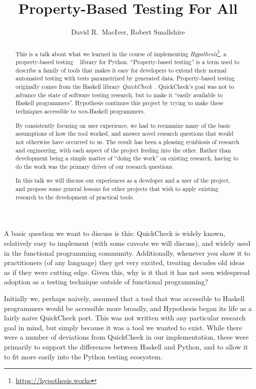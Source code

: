 \documentclass[10pt,conference]{IEEEtran}
\begin{document}
\author{David R.~MacIver, Robert Smallshire}
\title{Property-Based Testing For All}

\maketitle

\begin{abstract}
This is a talk about what we learned in the course of implementing \emph{Hypothesis}\footnote{\url{https://hypothesis.works}}, a property-based testing ~\cite{DBLP:conf/erlang/ArtsHJW06} library for Python.
``Property-based testing'' is a term used to describe a family of tools that makes it easy for developers to extend their normal automated testing with tests parametrized by generated data.
Property-based testing originally comes from the Haskell library \emph{QuickCheck}~\cite{DBLP:conf/icfp/ClaessenH00}.
QuickCheck's goal was not to advance the state of software testing research, but to make it ``easily available to Haskell programmers''. Hypothesis continues this project by trying to make these techniques accessible to \emph{non}-Haskell programmers.

By consistently focusing on user experience,
we had to reexamine many of the basic assumptions of how the tool worked,
and answer novel research questions that would not otherwise have occurred to us.
The result has been a pleasing symbiosis of research and engineering,
with each aspect of the project feeding into the other.
Rather than development being a simple matter of ``doing the work'' on existing research,
having to do the work was the primary driver of our research questions.

In this talk we will discuss our experiences as a developer and a user of the project,
and propose some general lessons for other projects that wish to apply existing research to the development of practical tools.
\end{abstract}

A basic question we want to discuss is this:
QuickCheck is widely known, relatively easy to implement (with some caveats we will discuss), and widely used in the functional programming community.
Additionally, whenever you show it to practitioners (of any language) they get very excited,
treating decades old ideas as if they were cutting edge.
Given this, why is it that it has not seen widespread adoption as a testing technique outside of functional programming?

Initially we, perhaps naively, assumed that a tool that was accessible to Haskell programmers would be accessible more broadly,
and Hypothesis began its life as a fairly naive QuickCheck port.
This was not written with any particular research goal in mind, but simply because it was a tool we wanted to exist.
While there were a number of deviations from QuickCheck in our implementation,
these were primarily to support the differences between Haskell and Python, and to allow it to fit more easily into the Python testing ecosystem.
\end{document}
